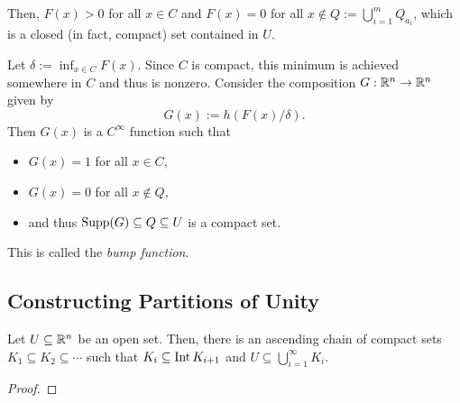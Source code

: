 Then, $F(x) > 0$ for all $x\in C$ and $F(x) = 0$ for all $x\notin Q := \bigcup_{i = 1}^m Q_{a_i}$, which is a closed (in fact, compact) set contained in $U$.

Let $\delta := \inf_{x\in C} F(x)$. Since $C$ is compact, this minimum is achieved somewhere in $C$ and thus is nonzero. Consider the composition $G: \mathbb{R}^n\to\mathbb{R}^n$ given by
\begin{equation*}
    G(x) := h\left(F(x)/\delta\right).
\end{equation*}
Then $G(x)$ is a $C^\infty$ function such that 
\begin{itemize}
    \item $G(x) = 1$ for all $x\in C$, 
    \item $G(x) = 0$ for all $x\notin Q$,
    \item and thus $\operatorname{Supp}(G)\subseteq Q\subseteq U$ is a compact set.
\end{itemize}

This is called the \emph{bump function}.

\subsection{Constructing Partitions of Unity}

\begin{lemma}
    Let $U\subseteq\mathbb{R}^n$ be an open set. Then, there is an ascending chain of compact sets $K_1\subseteq K_2\subseteq\cdots$ such that $K_i\subseteq\operatorname{Int} K_{i + 1}$ and $\displaystyle U\subseteq\bigcup_{i = 1}^\infty K_i$.
\end{lemma}
\begin{proof}
    
\end{proof}

